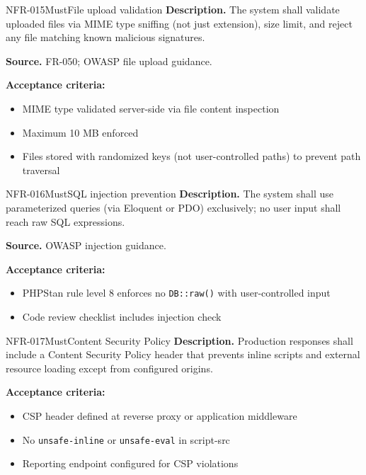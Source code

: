 \documentclass[11pt,a4paper]{article}
\begin{document}
\begin{requirement}{NFR-015}{Must}{File upload validation}
\textbf{Description.} The system shall validate uploaded files via MIME type sniffing (not just extension), size limit, and reject any file matching known malicious signatures.

\textbf{Source.} FR-050; OWASP file upload guidance.

\textbf{Acceptance criteria:}
\begin{itemize}
    \item MIME type validated server-side via file content inspection
    \item Maximum 10 MB enforced
    \item Files stored with randomized keys (not user-controlled paths) to prevent path traversal
\end{itemize}
\end{requirement}

\begin{requirement}{NFR-016}{Must}{SQL injection prevention}
\textbf{Description.} The system shall use parameterized queries (via Eloquent or PDO) exclusively; no user input shall reach raw SQL expressions.

\textbf{Source.} OWASP injection guidance.

\textbf{Acceptance criteria:}
\begin{itemize}
    \item PHPStan rule level 8 enforces no \texttt{DB::raw()} with user-controlled input
    \item Code review checklist includes injection check
\end{itemize}
\end{requirement}

\begin{requirement}{NFR-017}{Must}{Content Security Policy}
\textbf{Description.} Production responses shall include a Content Security Policy header that prevents inline scripts and external resource loading except from configured origins.

\textbf{Acceptance criteria:}
\begin{itemize}
    \item CSP header defined at reverse proxy or application middleware
    \item No \texttt{unsafe-inline} or \texttt{unsafe-eval} in script-src
    \item Reporting endpoint configured for CSP violations
\end{itemize}
\end{requirement}
\end{document}
